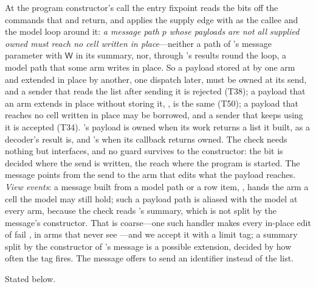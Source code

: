\begin{description}[leftmargin=1.2em,font=\normalfont\itshape]
At the program constructor's call the entry fixpoint reads the bits off the commands that  and
 return, and applies the supply edge with  as the callee and the model loop
around it: \emph{a message path $p$ whose payloads are not all supplied owned must reach no cell written
in place}---neither a path of 's message parameter with $\mathsf{W}$ in its summary, nor,
through 's results round the loop, a model path that some arm writes in place. So a payload
stored at  by one arm and extended in place by another, one dispatch later, must be owned
at its send, and a sender that reads the list after sending it is rejected (T38); a payload that an arm
extends in place without storing it, , is
the same (T50); a payload that reaches no cell written in place may be borrowed, and a sender that keeps
using it is accepted (T34). 's payload is owned when its work returns a list it built,
as a decoder's result is, and 's when its callback returns owned. The
check needs nothing but interfaces, and no guard survives to the constructor: the bit is decided where
the send is written, the reach where the program is started. The message points from the send to the arm
that edits what the payload reaches. \emph{View events}: a message built from a model path or a row item,
, hands the arm a cell the model may still hold; such a payload path is
aliased with the model at every arm, because the check reads 's summary, which is not split by
the message's constructor. That is coarse---one such handler makes every in-place edit of
 fail \Disjoint, in arms that never see ---and we accept it with a limit tag; a
summary split by the constructor of 's message is a possible extension, decided by how often
the tag fires. The message offers to send an identifier instead of the list.
\item[\Obl{P7}, write sets, not identity, decide what to re-render.] Stated below.
\end{description}

